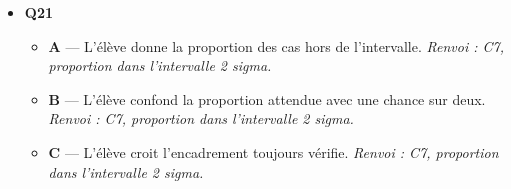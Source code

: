 \begin{itemize}
\begin{itemize}
  \end{itemize}
  \item \textbf{Q21}
  \begin{itemize}
    \item \textbf{A} — L'élève donne la proportion des cas hors de l'intervalle. \emph{Renvoi : C7, proportion dans l'intervalle 2 sigma.}
    \item \textbf{B} — L'élève confond la proportion attendue avec une chance sur deux. \emph{Renvoi : C7, proportion dans l'intervalle 2 sigma.}
    \item \textbf{C} — L'élève croit l'encadrement toujours vérifie. \emph{Renvoi : C7, proportion dans l'intervalle 2 sigma.}
  \end{itemize}
\end{itemize}
\fi
